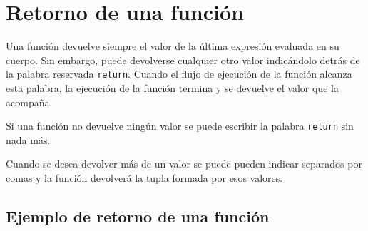 \documentclass[
  letterpaper,
  DIV=11,
  numbers=noendperiod]{scrreprt}
\newenvironment{Shaded}{\begin{snugshade}}{\end{snugshade}}
\newcommand{\DataTypeTok}[1]{\textcolor[rgb]{0.68,0.00,0.00}{#1}}
\newcommand{\FloatTok}[1]{\textcolor[rgb]{0.68,0.00,0.00}{#1}}
\newcommand{\FunctionTok}[1]{\textcolor[rgb]{0.28,0.35,0.67}{#1}}
\newcommand{\KeywordTok}[1]{\textcolor[rgb]{0.00,0.23,0.31}{#1}}
\newcommand{\NormalTok}[1]{\textcolor[rgb]{0.00,0.23,0.31}{#1}}
\newcommand{\OperatorTok}[1]{\textcolor[rgb]{0.37,0.37,0.37}{#1}}
\newcommand{\SpecialCharTok}[1]{\textcolor[rgb]{0.37,0.37,0.37}{#1}}
\newcommand{\StringTok}[1]{\textcolor[rgb]{0.13,0.47,0.30}{#1}}
\begin{document}
\begin{Shaded}
\end{Shaded}

\hypertarget{retorno-de-una-funciuxf3n}{%
\section{Retorno de una función}\label{retorno-de-una-funciuxf3n}}

Una función devuelve siempre el valor de la última expresión evaluada en
su cuerpo. Sin embargo, puede devolverse cualquier otro valor
indicándolo detrás de la palabra reservada \texttt{return}. Cuando el
flujo de ejecución de la función alcanza esta palabra, la ejecución de
la función termina y se devuelve el valor que la acompaña.

Si una función no devuelve ningún valor se puede escribir la palabra
\texttt{return} sin nada más.

Cuando se desea devolver más de un valor se puede pueden indicar
separados por comas y la función devolverá la tupla formada por esos
valores.

\hypertarget{ejemplo-de-retorno-de-una-funciuxf3n}{%
\subsection{Ejemplo de retorno de una
función}\label{ejemplo-de-retorno-de-una-funciuxf3n}}
\end{document}
